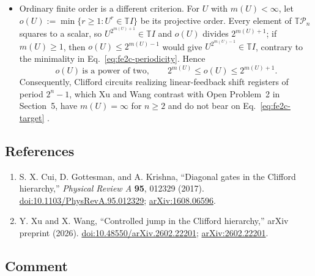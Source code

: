 \begin{itemize}
  \item Ordinary finite order is a different criterion.  For $U$ with
  $m(U)<\infty$, let $o(U):=\min\{r\geq1:U^r\in\mathbb{T}I\}$ be its projective
  order.  Every element of $\mathbb{T}\mathcal{P}_n$ squares to a scalar, so
  $U^{2^{m(U)+1}}\in\mathbb{T}I$ and $o(U)$ divides $2^{m(U)+1}$; if $m(U)\geq1$,
  then $o(U)\leq2^{m(U)-1}$ would give $U^{2^{m(U)-1}}\in\mathbb{T}I$, contrary to
  the minimality in Eq.~\eqref{eq:fe2c-periodicity}.  Hence
  \begin{equation}
    o(U)\ \text{is a power of two},
    \qquad
    2^{m(U)}\leq o(U)\leq2^{m(U)+1}.
    \label{eq:fe2c-order}
  \end{equation}
  Consequently, Clifford circuits realizing linear-feedback shift registers of
  period $2^n-1$, which Xu and Wang contrast with Open Problem~2 in Section~5,
  have $m(U)=\infty$ for $n\geq2$ and do not bear on
  Eq.~\eqref{eq:fe2c-target} .
\end{itemize}

\subsection*{References}

\begin{enumerate}[label={},leftmargin=4.8em,labelsep=0.5em]
  \footnotesize
  \item[\textup{[CGK17]}]\label{ref:fe2c-cgk17}
  S. X. Cui, D. Gottesman, and A. Krishna, ``Diagonal gates in the Clifford
  hierarchy,'' \emph{Physical Review A} \textbf{95}, 012329 (2017).
  \href{https://doi.org/10.1103/PhysRevA.95.012329}{doi:10.1103/PhysRevA.95.012329};
  \href{https://arxiv.org/abs/1608.06596}{arXiv:1608.06596}.

  \item[\textup{[XW26]}]\label{ref:fe2c-xw26}
  Y. Xu and X. Wang, ``Controlled jump in the Clifford hierarchy,'' arXiv
  preprint (2026).
  \href{https://doi.org/10.48550/arXiv.2602.22201}{doi:10.48550/arXiv.2602.22201};
  \href{https://arxiv.org/abs/2602.22201}{arXiv:2602.22201}.
\end{enumerate}

\subsection*{Comment}


